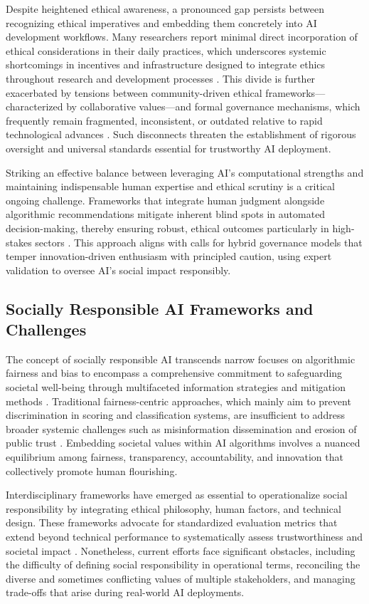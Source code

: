 \documentclass[sigconf]{acmart}
\begin{document}
Despite heightened ethical awareness, a pronounced gap persists between recognizing ethical imperatives and embedding them concretely into AI development workflows. Many researchers report minimal direct incorporation of ethical considerations in their daily practices, which underscores systemic shortcomings in incentives and infrastructure designed to integrate ethics throughout research and development processes \cite{ref9}. This divide is further exacerbated by tensions between community-driven ethical frameworks—characterized by collaborative values—and formal governance mechanisms, which frequently remain fragmented, inconsistent, or outdated relative to rapid technological advances \cite{ref25,ref36}. Such disconnects threaten the establishment of rigorous oversight and universal standards essential for trustworthy AI deployment.

Striking an effective balance between leveraging AI’s computational strengths and maintaining indispensable human expertise and ethical scrutiny is a critical ongoing challenge. Frameworks that integrate human judgment alongside algorithmic recommendations mitigate inherent blind spots in automated decision-making, thereby ensuring robust, ethical outcomes particularly in high-stakes sectors \cite{ref2}. This approach aligns with calls for hybrid governance models that temper innovation-driven enthusiasm with principled caution, using expert validation to oversee AI’s social impact responsibly.

\subsection{Socially Responsible AI Frameworks and Challenges}

The concept of socially responsible AI transcends narrow focuses on algorithmic fairness and bias to encompass a comprehensive commitment to safeguarding societal well-being through multifaceted information strategies and mitigation methods \cite{ref26}. Traditional fairness-centric approaches, which mainly aim to prevent discrimination in scoring and classification systems, are insufficient to address broader systemic challenges such as misinformation dissemination and erosion of public trust \cite{ref36}. Embedding societal values within AI algorithms involves a nuanced equilibrium among fairness, transparency, accountability, and innovation that collectively promote human flourishing.

Interdisciplinary frameworks have emerged as essential to operationalize social responsibility by integrating ethical philosophy, human factors, and technical design. These frameworks advocate for standardized evaluation metrics that extend beyond technical performance to systematically assess trustworthiness and societal impact \cite{ref26}. Nonetheless, current efforts face significant obstacles, including the difficulty of defining social responsibility in operational terms, reconciling the diverse and sometimes conflicting values of multiple stakeholders, and managing trade-offs that arise during real-world AI deployments.
\end{document}
